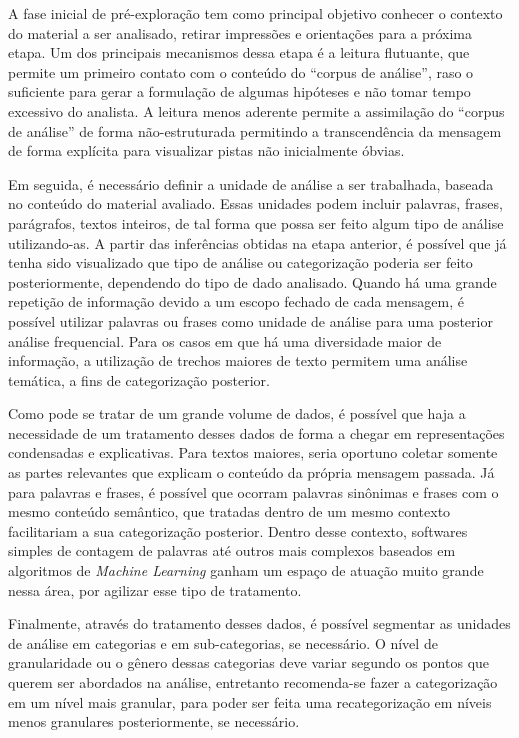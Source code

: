 A fase inicial de pré-exploração tem como principal objetivo conhecer o contexto do material a ser analisado, retirar impressões e orientações para a próxima etapa. Um dos principais mecanismos dessa etapa é a leitura flutuante, que permite um primeiro contato com o conteúdo do \enquote{corpus de análise}, raso o suficiente para gerar a formulação de algumas hipóteses e não tomar tempo excessivo do analista. A leitura menos aderente permite a assimilação do \enquote{corpus de análise} de forma não-estruturada permitindo a transcendência da mensagem de forma explícita para visualizar pistas não inicialmente óbvias.

Em seguida, é necessário definir a unidade de análise a ser trabalhada, baseada no conteúdo do material avaliado. Essas unidades podem incluir palavras, frases, parágrafos, textos inteiros, de tal forma que possa ser feito algum tipo de análise utilizando-as. A partir das inferências obtidas na etapa anterior, é possível que já tenha sido visualizado que tipo de análise ou categorização poderia ser feito posteriormente, dependendo do tipo de dado analisado. Quando há uma grande repetição de informação devido a um escopo fechado de cada mensagem, é possível utilizar palavras ou frases como unidade de análise para uma posterior análise frequencial. Para os casos em que há uma diversidade maior de informação, a utilização de trechos maiores de texto permitem uma análise temática, a fins de categorização posterior.

Como pode se tratar de um grande volume de dados, é possível que haja a necessidade de um tratamento desses dados de forma a chegar em representações condensadas e explicativas. Para textos maiores, seria oportuno coletar somente as partes relevantes que explicam o conteúdo da própria mensagem passada. Já para palavras e frases, é possível que ocorram palavras sinônimas e frases com o mesmo conteúdo semântico, que tratadas dentro de um mesmo contexto facilitariam a sua categorização posterior. Dentro desse contexto, softwares simples de contagem de palavras até outros mais complexos baseados em algoritmos de \textit{Machine Learning} ganham um espaço de atuação muito grande nessa área, por agilizar esse tipo de tratamento.

Finalmente, através do tratamento desses dados, é possível segmentar as unidades de análise em categorias e em sub-categorias, se necessário. O nível de granularidade ou o gênero dessas categorias deve variar segundo os pontos que querem ser abordados na análise, entretanto recomenda-se fazer a categorização em um nível mais granular, para poder ser feita uma recategorização em níveis menos granulares posteriormente, se necessário.

